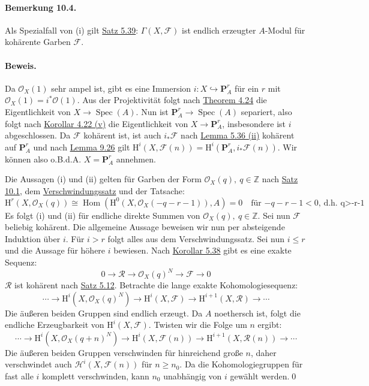 \paragraph{Bemerkung 10.4.}\label{10.4} Als Spezialfall von (i) gilt \hyperref[5.39]{Satz 5.39}: $\Gamma(X,\mathcal{F})$ ist endlich erzeugter $A$-Modul für kohärente Garben $\mathcal{F}$.

\paragraph{Beweis.} Da $\mathcal{O}_X(1)$ sehr ampel ist, gibt es eine Immersion $i:X\hookrightarrow  \mathbf{P}_A^r$ für ein $r$ mit $\mathcal{O}_X(1)=i^\ast\mathcal{O}(1)$. Aus der Projektivität folgt nach \hyperref[4.24]{Theorem 4.24} die Eigentlichkeit von $X\to\operatorname{Spec}(A)$. Nun ist $\mathbf{P}_A^r\to\operatorname{Spec}(A)$ separiert, also folgt nach \hyperref[4.22]{Korollar 4.22 (v)} die Eigentlichkeit von $X\to\mathbf{P}_A^r$, insbesondere ist $i$ abgeschlossen. Da $\mathcal{F}$ kohärent ist, ist auch $i_\ast\mathcal{F}$ nach \hyperref[5.36]{Lemma 5.36 (ii)} kohärent auf $\mathbf{P}_A^r$ und nach \hyperref[9.26]{Lemma 9.26} gilt $\mathrm{H}^i(X,\mathcal{F}(n)) =\mathrm{H}^i(\mathbf{P}_A^r, i_\ast\mathcal{F}(n))$. Wir können also o.B.d.A. $X=\mathbf{P}_A^r$ annehmen.

Die Aussagen (i) und (ii) gelten für Garben der Form $\mathcal{O}_X(q),\ q\in\mathbb{Z}$ nach \hyperref[10.1]{Satz 10.1}, dem \hyperref[9.27]{Verschwindungssatz} und der Tatsache:
\[\mathrm{H}^r(X,\mathcal{O}_X(q)) \cong \operatorname{Hom}(\mathrm{H}^0(X,\mathcal{O}_X(-q-r-1)), A) =0\quad\text{für $-q-r-1<0$, d.h. q>-r-1} \]
Es folgt (i) und (ii) für endliche direkte Summen von $\mathcal{O}_X(q),\ q\in\mathbb{Z}$. Sei nun $\mathcal{F}$ beliebig kohärent. Die allgemeine Aussage beweisen wir nun per absteigende Induktion über $i$. Für $i>r$ folgt alles aus dem Verschwindungssatz. Sei nun $i\leq r$ und die Aussage für höhere $i$ bewiesen. Nach \hyperref[5.38]{Korollar 5.38} gibt es eine exakte Sequenz:
\[0\longrightarrow\mathcal{R}\longrightarrow\mathcal{O}_X(q)^N\longrightarrow\mathcal{F}\longrightarrow 0 \]
$\mathcal{R}$ ist kohärent nach \hyperref[5.12]{Satz 5.12}. Betrachte die lange exakte Kohomologiesequenz:
\[\cdots\longrightarrow \mathrm{H}^i(X,\mathcal{O}_X(q)^N)\longrightarrow\mathrm{H}^i(X,\mathcal{F})\longrightarrow\mathrm{H}^{i+1}(X,\mathcal{R})\longrightarrow\cdots \]
Die äußeren beiden Gruppen sind endlich erzeugt. Da $A$ noethersch ist, folgt die endliche Erzeugbarkeit von $\mathrm{H}^i(X,\mathcal{F})$. Twisten wir die Folge um $n$ ergibt:
\[\cdots\longrightarrow \mathrm{H}^i(X,\mathcal{O}_X(q+n)^N)\longrightarrow\mathrm{H}^i(X,\mathcal{F}(n))\longrightarrow\mathrm{H}^{i+1}(X,\mathcal{R}(n))\longrightarrow\cdots\]
Die äußeren beiden Gruppen verschwinden für hinreichend große $n$, daher verschwindet auch $\mathcal{H}^i(X,\mathcal{F}(n))$ für $n\geq n_0$. Da die Kohomologiegruppen für fast alle $i$ komplett verschwinden, kann $n_0$ unabhängig von $i$ gewählt werden.\qed

